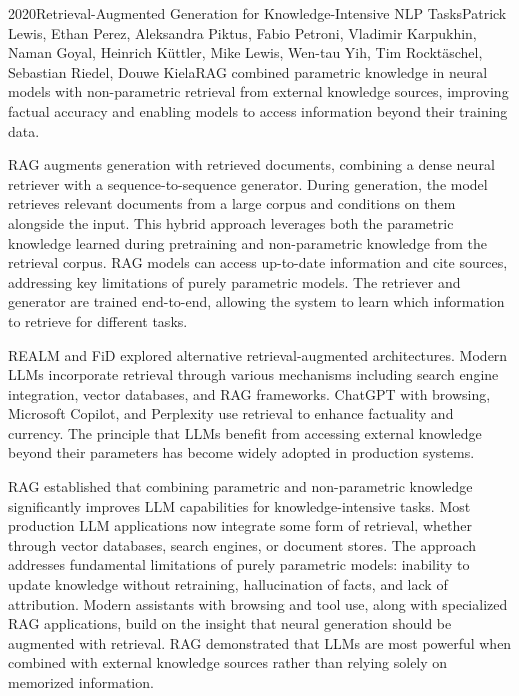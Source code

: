 
\begin{papersummary}{2020}{Retrieval-Augmented Generation for Knowledge-Intensive NLP Tasks}{Patrick Lewis, Ethan Perez, Aleksandra Piktus, Fabio Petroni, Vladimir Karpukhin, Naman Goyal, Heinrich Küttler, Mike Lewis, Wen-tau Yih, Tim Rocktäschel, Sebastian Riedel, Douwe Kiela}{RAG combined parametric knowledge in neural models with non-parametric retrieval from external knowledge sources, improving factual accuracy and enabling models to access information beyond their training data.}

RAG augments generation with retrieved documents, combining a dense neural retriever with a sequence-to-sequence generator. During generation, the model retrieves relevant documents from a large corpus and conditions on them alongside the input. This hybrid approach leverages both the parametric knowledge learned during pretraining and non-parametric knowledge from the retrieval corpus. RAG models can access up-to-date information and cite sources, addressing key limitations of purely parametric models. The retriever and generator are trained end-to-end, allowing the system to learn which information to retrieve for different tasks.

REALM and FiD explored alternative retrieval-augmented architectures. Modern LLMs incorporate retrieval through various mechanisms including search engine integration, vector databases, and RAG frameworks. ChatGPT with browsing, Microsoft Copilot, and Perplexity use retrieval to enhance factuality and currency. The principle that LLMs benefit from accessing external knowledge beyond their parameters has become widely adopted in production systems.

RAG established that combining parametric and non-parametric knowledge significantly improves LLM capabilities for knowledge-intensive tasks. Most production LLM applications now integrate some form of retrieval, whether through vector databases, search engines, or document stores. The approach addresses fundamental limitations of purely parametric models: inability to update knowledge without retraining, hallucination of facts, and lack of attribution. Modern assistants with browsing and tool use, along with specialized RAG applications, build on the insight that neural generation should be augmented with retrieval. RAG demonstrated that LLMs are most powerful when combined with external knowledge sources rather than relying solely on memorized information.

\end{papersummary}
